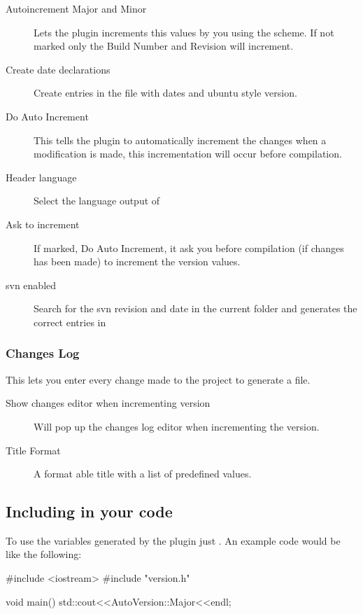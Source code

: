 \begin{description}
\item[Autoincrement Major and Minor] Lets the plugin increments this values by you using the scheme. If not marked only the Build Number and Revision will increment.
\item[Create date declarations] Create entries in the  file with dates and ubuntu style version.
\item[Do Auto Increment] This tells the plugin to automatically increment the changes when a modification is made, this incrementation will occur before compilation.
\item[Header language] Select the language output of 
\item[Ask to increment] If marked, Do Auto Increment, it ask you before compilation (if changes has been made) to increment the version values.
\item[svn enabled] Search for the svn revision and date in the current folder and generates the correct entries in 
\end{description}

\subsubsection{Changes Log}

This lets you enter every change made to the project to generate a  file.

\begin{description}
\item[Show changes editor when incrementing version] Will pop up the changes log editor when incrementing the version.
\item[Title Format] A format able title with a list of predefined values.
\end{description}

\subsection{Including in your code}

To use the variables generated by the plugin just . An example code would be like the following:

\begin{code}
#include <iostream>
#include "version.h"

void main(){
    std::cout<<AutoVersion::Major<<endl;
}
\end{code}

